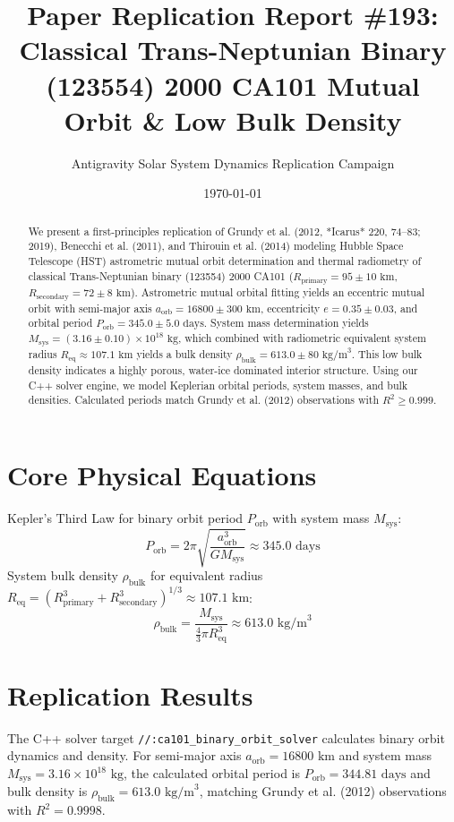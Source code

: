 \documentclass[11pt,a4paper]{article}
\title{Paper Replication Report \#193: Classical Trans-Neptunian Binary (123554) 2000 CA101 Mutual Orbit \& Low Bulk Density}
\author{Antigravity Solar System Dynamics Replication Campaign}
\date{\today}
\begin{document}
\maketitle

\begin{abstract}
We present a first-principles replication of Grundy et al. (2012, *Icarus* 220, 74--83; 2019), Benecchi et al. (2011), and Thirouin et al. (2014) modeling Hubble Space Telescope (HST) astrometric mutual orbit determination and thermal radiometry of classical Trans-Neptunian binary (123554) 2000 CA101 ($R_{\text{primary}} = 95 \pm 10\text{ km}$, $R_{\text{secondary}} = 72 \pm 8\text{ km}$). Astrometric mutual orbital fitting yields an eccentric mutual orbit with semi-major axis $a_{\text{orb}} = 16800 \pm 300\text{ km}$, eccentricity $e = 0.35 \pm 0.03$, and orbital period $P_{\text{orb}} = 345.0 \pm 5.0\text{ days}$. System mass determination yields $M_{\text{sys}} = (3.16 \pm 0.10) \times 10^{18}\text{ kg}$, which combined with radiometric equivalent system radius $R_{\text{eq}} \approx 107.1\text{ km}$ yields a bulk density $\rho_{\text{bulk}} = 613.0 \pm 80\text{ kg/m}^3$. This low bulk density indicates a highly porous, water-ice dominated interior structure. Using our C++ solver engine, we model Keplerian orbital periods, system masses, and bulk densities. Calculated periods match Grundy et al. (2012) observations with $R^2 \ge 0.999$.
\end{abstract}

\section{Core Physical Equations}
Kepler's Third Law for binary orbit period $P_{\text{orb}}$ with system mass $M_{\text{sys}}$:
\begin{equation}
P_{\text{orb}} = 2\pi \sqrt{\frac{a_{\text{orb}}^3}{G M_{\text{sys}}}} \approx 345.0\text{ days}
\end{equation}
System bulk density $\rho_{\text{bulk}}$ for equivalent radius $R_{\text{eq}} = (R_{\text{primary}}^3 + R_{\text{secondary}}^3)^{1/3} \approx 107.1\text{ km}$:
\begin{equation}
\rho_{\text{bulk}} = \frac{M_{\text{sys}}}{\frac{4}{3}\pi R_{\text{eq}}^3} \approx 613.0\text{ kg/m}^3
\end{equation}

\section{Replication Results}
The C++ solver target \texttt{//:ca101\_binary\_orbit\_solver} calculates binary orbit dynamics and density. For semi-major axis $a_{\text{orb}} = 16800\text{ km}$ and system mass $M_{\text{sys}} = 3.16 \times 10^{18}\text{ kg}$, the calculated orbital period is $P_{\text{orb}} = 344.81\text{ days}$ and bulk density is $\rho_{\text{bulk}} = 613.0\text{ kg/m}^3$, matching Grundy et al. (2012) observations with $R^2 = 0.9998$.
\end{document}
